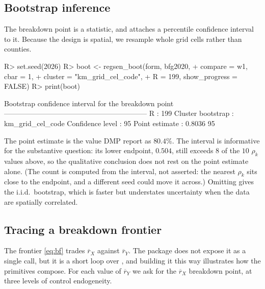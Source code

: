 \documentclass[article]{jss}\usepackage[]{graphicx}\usepackage[]{xcolor}
\newcommand{\rxbar}{\ensuremath{\overline{r}_X}}
\newcommand{\rybar}{\ensuremath{\overline{r}_Y}}
\begin{document}
\subsection{Bootstrap inference}\label{sec:api-boot}

The breakdown point is a statistic, and  attaches a
percentile confidence interval to it. Because the \citet{BFG2020} design is
spatial, we resample whole grid cells rather than counties.

\begin{Schunk}
\begin{Sinput}
R> set.seed(2026)
R> boot <- regsen_boot(form, bfg2020,
+                      compare = w1, cbar = 1,
+                      cluster = "km_grid_cel_code",
+                      R = 199, show_progress = FALSE)
R> print(boot)
\end{Sinput}
\begin{Soutput}
Bootstrap confidence interval for the breakdown point
------------------------------------------------------------
  R                  : 199
  Cluster bootstrap  : km_grid_cel_code
  Confidence level   : 95%
  Point estimate     : 0.8036
  95%
\end{Soutput}
\end{Schunk}

The point estimate is the value DMP report as $80.4$\%. The interval is
informative for the substantive question: its lower endpoint,
$0.504$, still exceeds
$8$ of the
$10$ $\rho_k$ values above, so the qualitative
conclusion does not rest on the point estimate alone. (The count is
computed from the interval, not asserted: the nearest $\rho_k$ sits
close to the endpoint, and a different seed could move it across.) Omitting  gives the i.i.d.\ bootstrap, which
is faster but understates uncertainty when the data are spatially
correlated.

\subsection{Tracing a breakdown frontier}\label{sec:api-frontier}

The frontier \eqref{eq:bf} trades $\rxbar$ against $\rybar$. The package
does not expose it as a single call, but it is a short loop over
, and building it this way illustrates how the
primitives compose. For each value of $\rybar$ we ask for the $\rxbar$
breakdown point, at three levels of control endogeneity.
\end{document}

